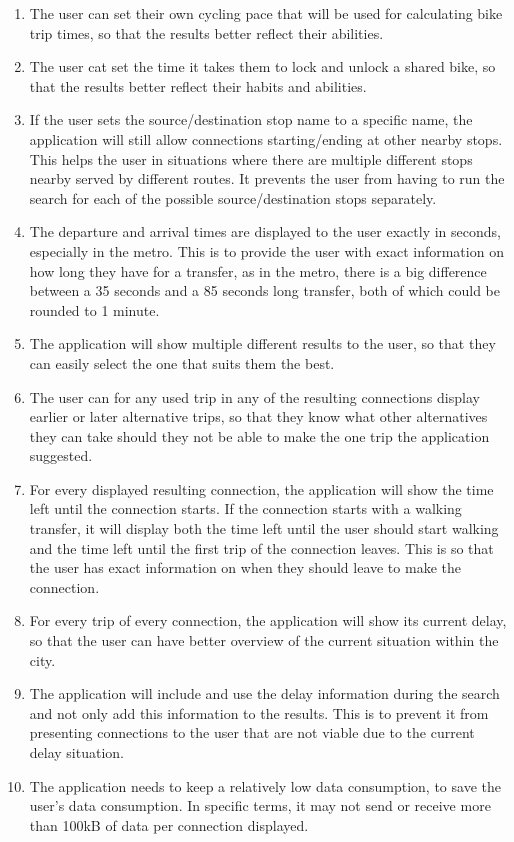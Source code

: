 \begin{enumerate}
\item The user can set their own cycling pace that will be used for calculating bike trip times, so that the results better reflect their abilities.
\item The user cat set the time it takes them to lock and unlock a shared bike, so that the results better reflect their habits and abilities.
\item If the user sets the source/destination stop name to a specific name, the application will still allow connections starting/ending at other nearby stops. This helps the user in situations where there are multiple different stops nearby served by different routes. It prevents the user from having to run the search for each of the possible source/destination stops separately. 
\item The departure and arrival times are displayed to the user exactly in seconds, especially in the metro. This is to provide the user with exact information on how long they have for a transfer, as in the metro, there is a big difference between a 35 seconds and a 85 seconds long transfer, both of which could be rounded to 1 minute.
\item The application will show multiple different results to the user, so that they can easily select the one that suits them the best.
\item The user can for any used trip in any of the resulting connections display earlier or later alternative trips, so that they know what other alternatives they can take should they not be able to make the one trip the application suggested.
\item For every displayed resulting connection, the application will show the time left until the connection starts. If the connection starts with a walking transfer, it will display both the time left until the user should start walking and the time left until the first trip of the connection leaves. This is so that the user has exact information on when they should leave to make the connection.
\item For every trip of every connection, the application will show its current delay, so that the user can have better overview of the current situation within the city.
\item The application will include and use the delay information during the search and not only add this information to the results. This is to prevent it from presenting connections to the user that are not viable due to the current delay situation.
\item The application needs to keep a relatively low data consumption, to save the user's data consumption. In specific terms, it may not send or receive more than 100kB of data per connection displayed.
\end{enumerate}



